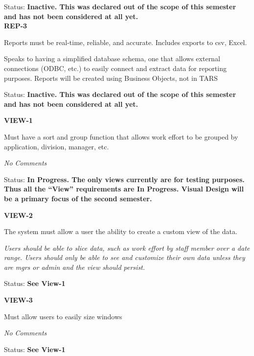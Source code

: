 \noindent Status: \textbf{Inactive.   This was declared out of the scope of this semester and has not been considered at all yet.}\\

  

\noindent \textbf{REP-3}

\noindent Reports must be real-time, reliable, and accurate. Includes exports to csv, Excel.

\noindent Speaks to having a simplified database schema, one that allows external connections (ODBC, etc.) to easily connect and extract data for reporting purposes. Reports will be created using Business Objects, not in TARS

\noindent Status: \textbf{Inactive.   This was declared out of the scope of this semester and has not been considered at all yet.}\\

\noindent 

\noindent \textbf{VIEW-1}

\noindent Must have a sort and group function that allows work effort to be grouped by application, division, manager, etc.

 \textit{No Comments}

\noindent Status: \textbf{In Progress.  The only views currently are for testing purposes.  Thus all the ``View'' requirements are In Progress.  Visual Design will be a primary focus of the second semester.}\textit{ }\\

\noindent \textit{}

\noindent \textbf{VIEW-2}

\noindent The system must allow a user the ability to create a custom view of the data.

\noindent \textit{Users should be able to slice data, such as work effort by staff member over a date range. Users should only be able to see and customize their own data unless they are mgrs or admin and the view should persist.}

Status: \textbf{See View-1}\\

\noindent 

\noindent \textbf{VIEW-3}

\noindent Must allow users to easily size windows

 \textit{No Comments}

\textit{ }Status: \textbf{See View-1}\textit{}\\

